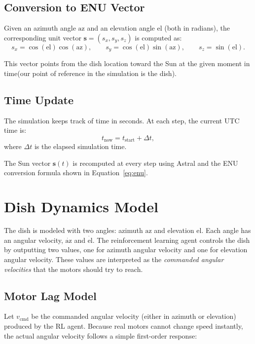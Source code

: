 \documentclass[11pt,a4paper]{article}
\begin{document}
\subsection{Conversion to ENU Vector}

Given an azimuth angle $\mathrm{az}$ and an elevation angle $\mathrm{el}$ (both in radians), the corresponding unit vector
$\mathbf{s} = (s_x, s_y, s_z)$ is computed as:
\begin{equation}
\label{eq:enu}
s_x = \cos(\mathrm{el}) \cos(\mathrm{az}), \qquad
s_y = \cos(\mathrm{el}) \sin(\mathrm{az}), \qquad
s_z = \sin(\mathrm{el}).
\end{equation}

This vector points from the dish location toward the Sun at the given moment in time(our point of reference in the simulation is the dish).

\subsection{Time Update}

The simulation keeps track of time in seconds.  
At each step, the current UTC time is:
\begin{equation}
t_{\text{now}} = t_{\text{start}} + \Delta t,
\end{equation}
where $\Delta t$ is the elapsed simulation time.  

The Sun vector $\mathbf{s}(t)$ is recomputed at every step using Astral and the
ENU conversion formula shown in Equation~\ref{eq:enu}.

\section{Dish Dynamics Model}

The dish is modeled with two angles: azimuth $\mathrm{az}$ and elevation $\mathrm{el}$.  
Each angle has an angular velocity, $\dot{\mathrm{az}}$ and $\dot{\mathrm{el}}$.  
The reinforcement learning agent controls the dish by outputting two values, one for azimuth angular velocity and one for elevation angular velocity.  
These values are interpreted as the \emph{commanded angular velocities} that the motors should try to reach.

\subsection{Motor Lag Model}

Let $v_{\text{cmd}}$ be the commanded angular velocity (either in azimuth or elevation) produced by the RL agent.  
Because real motors cannot change speed instantly, the actual angular velocity follows a simple first-order response:
\end{document}
